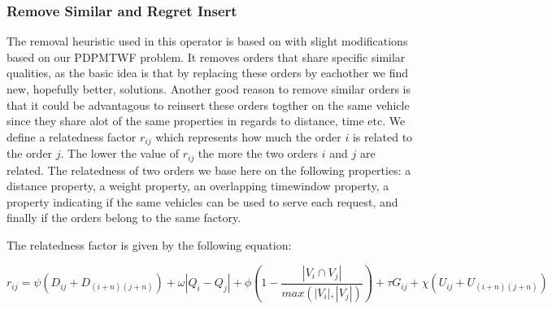 \documentclass[../main.tex]{subfiles}
\begin{document}
\subsubsection{Remove Similar and Regret Insert}
\label{sec:shaw}
The removal heuristic used in this operator is based on \citet{shaw97} with slight modifications based on our PDPMTWF problem. 
It removes orders that share specific similar qualities, as the basic idea is that by replacing these orders by eachother we find new, hopefully better, solutions. 
Another good reason to remove similar orders is that it could be advantagous to reinsert these orders togther on the same vehicle since they share alot of the same properties in regards to distance, time etc.
We define a relatedness factor $r_{ij}$ which represents how much the order $i$ is related to the order $j$. 
The lower the value of $r_{ij}$ the more the two orders $i$ and $j$ are related.
The relatedness of two orders we base here on the following properties: 
a distance property, a weight property, an overlapping timewindow property, a property indicating if the same vehicles can be used to serve each request, and finally if the orders belong to the same factory.

The relatedness factor is given by the following equation:

\begin{equation}
\label{relatedness}
    r_{ij} = \psi ( D_{i j} + D_{(i+n)(j+n)}) + \omega|Q_i - Q_j|
    + \phi (1-\dfrac{|V_i\cap V_j|}{max(|V_i|, |V_j|)} ) + \tau G_{ij} + \chi (U_{ij} + U_{(i+n)(j+n)})
\end{equation}
\end{document}
